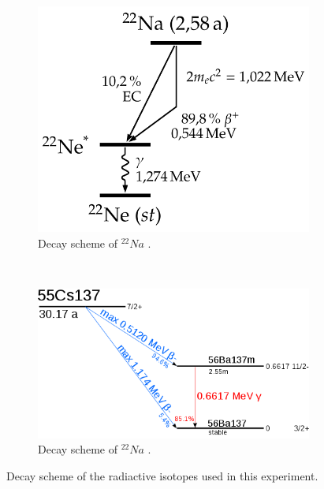 \documentclass[bigchapter,colorback,accentcolor=tud4b,linedtoc,11pt]{tudreport}
\begin{document}
\begin{figure}[H]
    \centering
    \begin{subfigure}[H]{0.44\textwidth}
        \includegraphics[width=\textwidth]{img/termschema_na22.png}
        \caption{Decay scheme of $^{22}Na$ \cite{na22decay}.}
        \label{fig:gull}
    \end{subfigure}%
    \qquad
    ~ %
    \begin{subfigure}[H]{0.44\textwidth}
        \includegraphics[width=\textwidth]{img/Cs-137-decay.png}
        \caption{Decay scheme of $^{22}Na$ \cite{cs137decay}.}
        \label{fig:tiger}
    \end{subfigure}
    \caption{Decay scheme of the radiactive isotopes used in this experiment.}
\end{figure}
\end{document}
